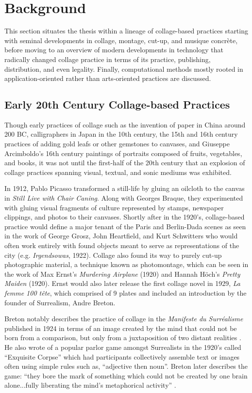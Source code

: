 \documentclass[a4paper,11pt,final]{ThesisStyle}
\begin{document}
\section{Background}

This section situates the thesis within a lineage of collage-based practices starting with seminal developments in collage, montage, cut-up, and musique concr\`ete, before moving to an overview of modern developments in technology that radically changed collage practice in terms of its practice, publishing, distribution, and even legality.  Finally, computational methods mostly rooted in application-oriented rather than arts-oriented practices are discussed.  

\subsection{Early 20th Century Collage-based Practices}
Though early practices of collage such as the invention of paper in China around 200 BC, calligraphers in Japan in the 10th century, the 15th and 16th century practices of adding gold leafs or other gemstones to canvases, and Giuseppe Arcimboldo's 16th century paintings of portraits composed of fruits, vegetables, and books, it was not until the first-half of the 20th century that an explosion of collage practices spanning visual, textual, and sonic mediums was exhibited.  

In 1912, Pablo Picasso transformed a still-life by gluing an oilcloth to the canvas in \textit{Still Live with Chair Caning}.  Along with Georges Braque, they experimented with gluing visual fragments of culture represented by stamps, newspaper clippings, and photos to their canvases.  Shortly after in the 1920's, collage-based practice would define a major tenant of the Paris and Berlin-Dada scenes as seen in the work of George Grosz, John Heartfield, and Kurt Schwitters who would often work entirely with found objects meant to serve as representations of the city (e.g. \textit{Irgendsowas}, 1922).  Collage also found its way to purely cut-up photographic material, a technique known as photomontage, which can be seen in the work of Max Ernst's \textit{Murdering Airplane} (1920) and Hannah H\"och's \textit{Pretty Maiden} (1920).  Ernst would also later release the first collage novel in 1929, \textit{La femme 100 t\^{e}te}, which comprised of 9 plates and included an introduction by the founder of Surrealism, Andre Breton.  

Breton notably describes the practice of collage in the \textit{Manifeste du Surr\'{e}alisme} published in 1924 in terms of an image created by the mind that could not be born from a comparison, but only from a juxtaposition of two distant realities \cite{Breton1924}.  He also wrote of a popular parlor game amongst Surrealists in the 1920's called ``Exquisite Corpse'' which had participants collectively assemble text or images often using simple rules such as, ``adjective then noun''.  Breton later describes the game: ``they bore the mark of something which could not be created by one brain alone...fully liberating the mind's metaphorical activity'' \cite{BretonRemembers}.    
\end{document}
